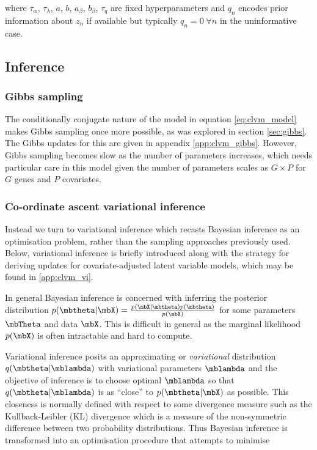 where $\tau_\alpha$, $\tau_\lambda$, $a$, $b$, $a_\beta$, $b_\beta$, $\tau_q$ are fixed hyperparameters and $q_n$ encodes prior information about $z_n$ if available but typically $q_n = 0 \; \forall n$ in the uninformative case.



\subsection{Inference}

\subsubsection{Gibbs sampling}

The conditionally conjugate nature of the model in equation \ref{eq:clvm_model} makes Gibbs sampling once more possible, as was explored in section \ref{sec:gibbs}. The Gibbs updates for this are given in appendix \ref{app:clvm_gibbs}. However, Gibbs sampling becomes slow as the number of parameters increases, which needs particular care in this model given the number of parameters scales as $G \times P$ for $G$ genes and $P$ covariates.

\subsubsection{Co-ordinate ascent variational inference}

Instead we turn to variational inference which recasts Bayesian inference as an optimisation problem, rather than the sampling approaches previously used. Below, variational inference is briefly introduced along with the strategy for deriving updates for covariate-adjusted latent variable models, which may be found in \ref{app:clvm_vi}.

In general Bayesian inference is concerned with inferring the posterior distribution $p(\mbtheta | \mbX) = \frac{p(\mbX | \mbtheta) p(\mbtheta)}{p(\mbX)}$ for some parameters $\mbTheta$ and data $\mbX$. This is difficult in general as the marginal likelihood $p(\mbX)$ is often intractable and hard to compute.

Variational inference posits an approximating or \emph{variational} distribution $q(\mbtheta | \mblambda)$ with variational parameters $\mblambda$ and the objective of inference is to choose optimal $\mblambda$ so that $q(\mbtheta | \mblambda)$ is as ``close'' to $p(\mbtheta | \mbX)$ as possible. This closeness is normally defined with respect to some divergence measure such as the Kullback-Leibler (KL) divergence which is a measure of the non-symmetric difference between two probability distributions. Thus Bayesian inference is transformed into an optimisation procedure that attempts to minimise

